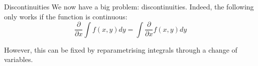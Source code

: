 \documentclass[a4paper]{article}
\begin{document}
\begin{parag}{Discontinuities}
    We now have a big problem: discontinuities. Indeed, the following only works if the function is continuous:
    \[\frac{\partial }{\partial x} \int f\left(x, y\right) dy = \int \frac{\partial }{\partial x} f\left(x, y\right)dy\]

    However, this can be fixed by reparametrising integrals through a change of variables.
\end{parag}
\end{document}
